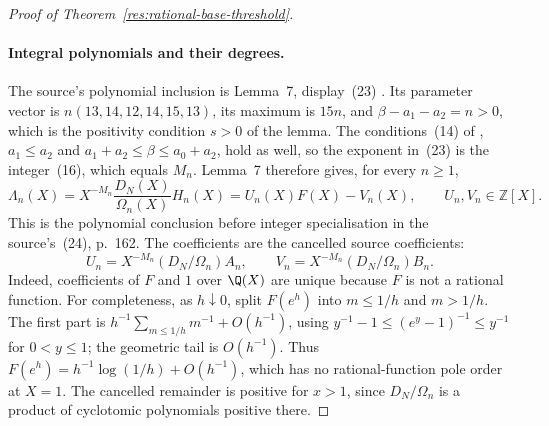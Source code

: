 \documentclass[11pt]{article}
\begin{document}
\begin{proof}[Proof of Theorem~\ref{res:rational-base-threshold}]
\paragraph{Integral polynomials and their degrees.}
The source's polynomial inclusion is Lemma~7, display~(23)
\cite[p.~161]{zudilin2004}.
Its parameter vector is $n(13,14,12,14,15,13)$, its maximum is $15n$, and
$\beta-a_1-a_2=n>0$, which is the positivity condition $s>0$ of the lemma.
The conditions~(14) of \cite[p.~157]{zudilin2004}, $a_1\le a_2$ and
$a_1+a_2\le\beta\le a_0+a_2$, hold as well, so the exponent in~(23) is the
integer~(16), which equals $M_n$. Lemma~7 therefore gives, for every
$n\ge1$,
\[
 \Lambda_n(X)=X^{-M_n}\frac{D_N(X)}{\Omega_n(X)}H_n(X)
            =U_n(X)F(X)-V_n(X),\qquad U_n,V_n\in\mathbb Z[X].
\]
This is the polynomial conclusion before integer specialisation in the
source's~(24), p.~162. The coefficients are the cancelled source coefficients:
\[
 U_n=X^{-M_n}(D_N/\Omega_n)A_n,\qquad
 V_n=X^{-M_n}(D_N/\Omega_n)B_n.
\]
Indeed, coefficients of $F$ and $1$ over $\Q(X)$ are unique because
$F$ is not a rational function. For completeness, as $h\downarrow0$,
split $F(e^h)$ into $m\le1/h$ and $m>1/h$. The first part is
$h^{-1}\sum_{m\le1/h}m^{-1}+O(h^{-1})$, using
$y^{-1}-1\le(e^y-1)^{-1}\le y^{-1}$ for $0<y\le1$;
the geometric tail is $O(h^{-1})$. Thus
$F(e^h)=h^{-1}\log(1/h)+O(h^{-1})$, which has no rational-function
pole order at $X=1$. The cancelled remainder is positive for $x>1$,
since $D_N/\Omega_n$ is a product of cyclotomic polynomials positive there.


\end{proof}
\end{document}

